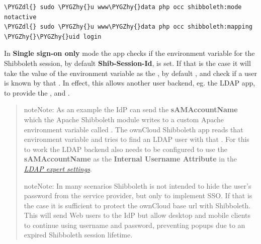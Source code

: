 \documentclass[letterpaper,10pt,english]{sphinxmanual}
\def\PYGZdl{\char`\$}
\def\PYGZhy{\char`\-}
\begin{document}
\begin{Verbatim}[commandchars=\\\{\}]
\PYGZdl{} sudo \PYGZhy{}u www\PYGZhy{}data php occ shibboleth:mode notactive
\PYGZdl{} sudo \PYGZhy{}u www\PYGZhy{}data php occ shibboleth:mapping \PYGZhy{}\PYGZhy{}uid login
\end{Verbatim}

In \textbf{Single sign-on only} mode the app checks if the environment variable for
the Shibboleth session, by default \textbf{Shib-Session-Id}, is set. If that is the
case it will take the value of the environment variable as the , by
default , and check if a user is known by that . In effect, this
allows another user backend, eg. the LDAP app, to provide the ,
 and .
\begin{quote}

\begin{notice}{note}{Note:}
As an example the IdP can send the \textbf{sAMAccountName} which the
Apache Shibboleth module writes to a custom Apache environment variable
called . The ownCloud Shibboleth app reads that 
environment variable and tries to find an LDAP user with that . For
this to work the LDAP backend also needs to be configured to use the
\textbf{sAMAccountName} as the \textbf{Internal Username Attribute} in the
{\hyperref[configuration_user/user_auth_ldap::doc]{\emph{LDAP expert settings}}}.
\end{notice}

\begin{notice}{note}{Note:}
In many scenarios Shibboleth is not intended to hide the user's
password from the service provider, but only to implement SSO. If that is
the case it is sufficient to protect the ownCloud base url with Shibboleth.
This will send Web users to the IdP but allow desktop and mobile clients to
continue using username and password, preventing popups due to an expired
Shibboleth session lifetime.
\end{notice}
\end{quote}
\end{document}
